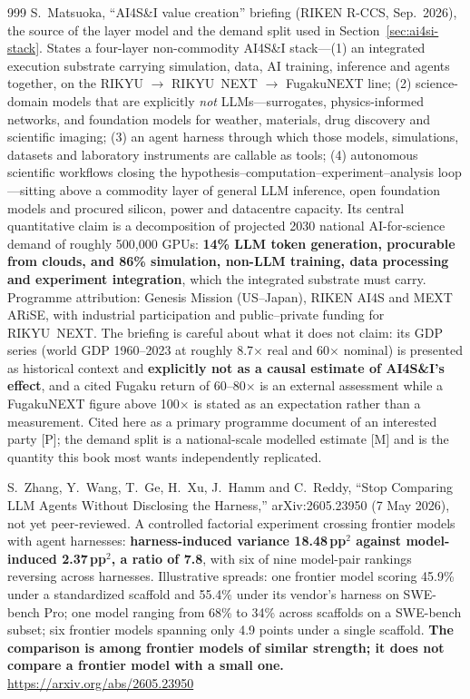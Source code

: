 \begin{thebibliography}{999}
 S.~Matsuoka, ``AI4S\&I value creation'' briefing (RIKEN R-CCS, Sep.\ 2026), the source of the layer model and the demand split used in Section~\ref{sec:ai4si-stack}. States a four-layer non-commodity AI4S\&I stack---(1) an integrated execution substrate carrying simulation, data, AI training, inference and agents together, on the RIKYU $\rightarrow$ RIKYU~NEXT $\rightarrow$ FugakuNEXT line; (2) science-domain models that are explicitly \emph{not} LLMs---surrogates, physics-informed networks, and foundation models for weather, materials, drug discovery and scientific imaging; (3) an agent harness through which those models, simulations, datasets and laboratory instruments are callable as tools; (4) autonomous scientific workflows closing the hypothesis--computation--experiment--analysis loop---sitting above a commodity layer of general LLM inference, open foundation models and procured silicon, power and datacentre capacity. Its central quantitative claim is a decomposition of projected 2030 national AI-for-science demand of roughly 500,000 GPUs: \textbf{14\% LLM token generation, procurable from clouds, and 86\% simulation, non-LLM training, data processing and experiment integration}, which the integrated substrate must carry. Programme attribution: Genesis Mission (US--Japan), RIKEN AI4S and MEXT ARiSE, with industrial participation and public--private funding for RIKYU~NEXT. The briefing is careful about what it does not claim: its GDP series (world GDP 1960--2023 at roughly 8.7$\times$ real and 60$\times$ nominal) is presented as historical context and \textbf{explicitly not as a causal estimate of AI4S\&I's effect}, and a cited Fugaku return of 60--80$\times$ is an external assessment while a FugakuNEXT figure above 100$\times$ is stated as an expectation rather than a measurement. Cited here as a primary programme document of an interested party [P]; the demand split is a national-scale modelled estimate [M] and is the quantity this book most wants independently replicated.



 S.~Zhang, Y.~Wang, T.~Ge, H.~Xu, J.~Hamm and C.~Reddy, ``Stop Comparing LLM Agents Without Disclosing the Harness,'' arXiv:2605.23950 (7 May 2026), not yet peer-reviewed. A controlled factorial experiment crossing frontier models with agent harnesses: \textbf{harness-induced variance 18.48\,pp$^2$ against model-induced 2.37\,pp$^2$, a ratio of 7.8}, with six of nine model-pair rankings reversing across harnesses. Illustrative spreads: one frontier model scoring 45.9\% under a standardized scaffold and 55.4\% under its vendor's harness on SWE-bench Pro; one model ranging from 68\% to 34\% across scaffolds on a SWE-bench subset; six frontier models spanning only 4.9 points under a single scaffold. \textbf{The comparison is among frontier models of similar strength; it does not compare a frontier model with a small one.} \url{https://arxiv.org/abs/2605.23950}


\end{thebibliography}
